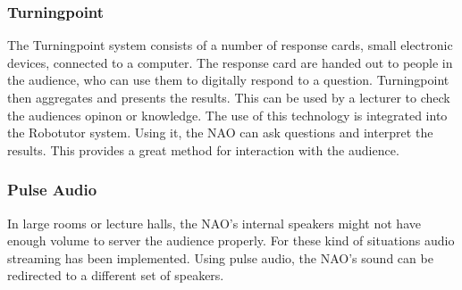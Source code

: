 \subsubsection{Turningpoint}
The Turningpoint system consists of a number of response cards, small electronic devices, connected to a computer. The response card are handed out to people in the audience, who can use them to digitally respond to a question. Turningpoint then aggregates and presents the results. This can be used by a lecturer to check the audiences opinon or knowledge. The use of this technology is integrated into the Robotutor system. Using it, the NAO can ask questions and interpret the results. This provides a great method for interaction with the audience.

\subsubsection{Pulse Audio}
In large rooms or lecture halls, the NAO's internal speakers might not have enough volume to server the audience properly. For these kind of situations audio streaming has been implemented. Using pulse audio, the NAO's sound can be redirected to a different set of speakers.
